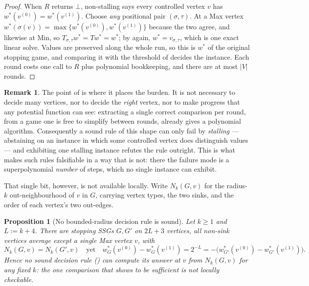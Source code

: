 \documentclass[11pt]{article}
\theoremstyle{plain}
\newtheorem{proposition}[theorem]{Proposition}
\theoremstyle{definition}
\newtheorem{remark}[theorem]{Remark}
\begin{document}
\begin{proof}
When $R$ returns $\bot$, non-stalling says every controlled vertex $v$
has $w^\ast(v^{(0)})=w^\ast(v^{(1)})$. Choose \emph{any} positional pair
$(\sigma,\tau)$. At a Max vertex
$w^\ast(\sigma(v))=\max\{w^\ast(v^{(0)}),w^\ast(v^{(1)})\}$ because the
two agree, and likewise at Min, so $T_{\sigma,\tau}w^\ast=Tw^\ast=w^\ast$;
by  again, $w^\ast=v_{\sigma,\tau}$, which is one
exact linear solve. Values are preserved along the whole run, so this is
$w^\ast$ of the original stopping game, and comparing it with the
threshold of  decides the instance. Each
round costs one call to $R$ plus polynomial bookkeeping, and there are at
most $|V|$ rounds.
\end{proof}

\begin{remark}
The point of  is where it places the burden.
It is not necessary to decide many vertices, nor to decide the
\emph{right} vertex, nor to make progress that any potential function can
see: extracting a single correct comparison per round, from a game one is
free to simplify between rounds, already gives a polynomial algorithm.
Consequently a sound rule of this shape can only fail by \emph{stalling}
--- abstaining on an instance in which some controlled vertex does
distinguish values --- and exhibiting one stalling instance refutes the
rule outright. This is what makes such rules falsifiable in a way that
 is not: there the failure mode is a superpolynomial
\emph{number} of steps, which no single instance can exhibit.
\end{remark}

That single bit, however, is not available locally. Write $N_k(G,v)$ for
the radius-$k$ out-neighbourhood of $v$ in $G$, carrying vertex types,
the two sinks, and the order of each vertex's two out-edges.

\begin{proposition}[No bounded-radius decision rule is sound]\label{prop:locality}
Let $k\ge1$ and $L:=k+4$. There are stopping SSGs $G,G'$ on $2L+3$
vertices, all non-sink vertices average except a single Max vertex $v$,
with
\[
  N_k(G,v)=N_k(G',v)
  \quad\text{yet}\quad
  w^\ast_G(v^{(0)})-w^\ast_G(v^{(1)})=2^{-L}
  =-\bigl(w^\ast_{G'}(v^{(0)})-w^\ast_{G'}(v^{(1)})\bigr).
\]
Hence no sound decision rule () can compute its
answer at $v$ from $N_k(G,v)$ for any fixed $k$: the one comparison that
 shows to be sufficient is not locally
checkable.
\end{proposition}
\end{document}
